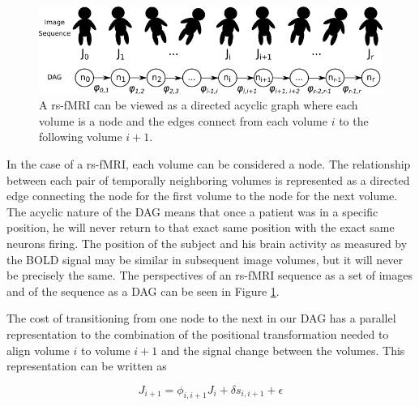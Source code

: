 \begin{figure}
\centering
\includegraphics[width=.7\textwidth]{4/dag-chain.png}
\caption{A rs-fMRI can be viewed as a directed acyclic graph where each volume is a node and the edges connect from each volume $i$ to the following volume $i+1$.}
\label{ch4:fig:dag-chain}
\end{figure}

In the case of a rs-fMRI, each volume can be considered a node. The relationship between each pair of temporally neighboring volumes is represented as a directed edge connecting the node for the first volume to the node for the next volume. The acyclic nature of the DAG means that once a patient was in a specific position, he will never return to that exact same position with the exact same neurons firing. The position of the subject and his brain activity as measured by the BOLD signal may be similar in subsequent image volumes, but it will never be precisely the same. The perspectives of an rs-fMRI sequence as a set of images and of the sequence as a DAG can be seen in Figure \ref{ch4:fig:dag-chain}.

The cost of transitioning from one node to the next in our DAG has a parallel representation to the combination of the positional transformation needed to align volume $i$ to volume $i+1$ and the signal change between the volumes. This representation can be written as 

\begin{equation}
J_{i+1} = \phi_{i,i+1} J_i + \delta s_{i,i+1} + \epsilon
\end{equation}


